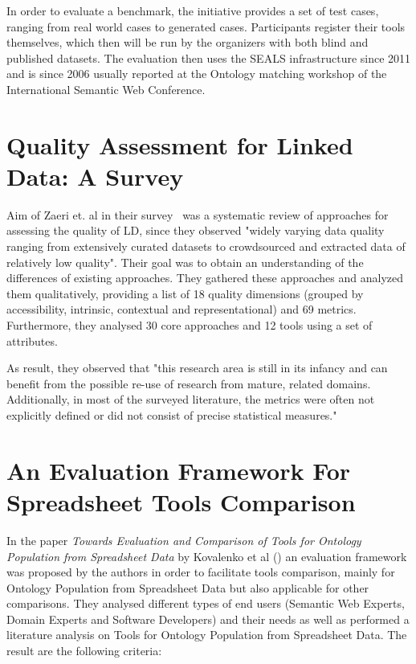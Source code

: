 In order to evaluate a benchmark, the initiative provides a set of test cases, ranging from real world cases to generated cases. Participants register their tools themselves, which then will be run by the organizers with both blind and published datasets. The evaluation then uses the SEALS infrastructure since 2011 and is since 2006 usually reported at the Ontology matching workshop of the International Semantic Web Conference.

\section{Quality Assessment for Linked Data: A Survey}

Aim of Zaeri et. al in their survey~\cite{zaveri2016quality} was a systematic review of approaches for assessing the quality of LD, since they observed "widely varying data quality ranging from extensively curated datasets to crowdsourced and extracted data of relatively low quality". Their goal was to obtain an understanding of the differences of existing approaches. They gathered these approaches and analyzed them qualitatively, providing a list of 18 quality dimensions (grouped by accessibility, intrinsic, contextual and representational) and 69 metrics. Furthermore, they analysed 30 core approaches and 12 tools using a set of attributes.

As result, they observed that "this research area is still in its infancy and can benefit from the possible re-use of research from mature, related domains. Additionally, in most of the surveyed literature, the metrics were often not explicitly defined or did not consist of precise statistical measures."

\section{An Evaluation Framework For Spreadsheet Tools Comparison}

In the paper \emph{Towards Evaluation and Comparison of Tools for Ontology Population from Spreadsheet Data} by Kovalenko et al (\cite{kovalenko2013towards}) an evaluation framework was proposed by the authors in order to facilitate tools comparison, mainly for Ontology Population from Spreadsheet Data but also applicable for other comparisons. They analysed different types of end users (Semantic Web Experts, Domain Experts and Software Developers) and their needs as well as performed a literature analysis on Tools for Ontology Population from Spreadsheet Data. The result are the following criteria:

